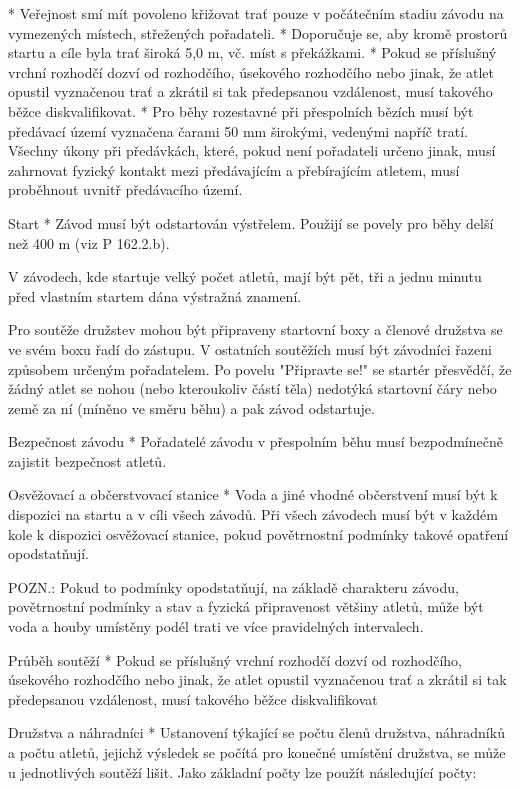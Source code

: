   * Veřejnost smí mít povoleno křižovat trať pouze v počátečním stadiu závodu na vymezených místech, střežených pořadateli.
  * Doporučuje se, aby kromě prostorů startu a cíle byla trať široká 5,0 m, vč. míst s překážkami.
  * Pokud se příslušný vrchní rozhodčí dozví od rozhodčího, úsekového rozhodčího nebo jinak, že atlet opustil vyznačenou trať a zkrátil si tak předepsanou vzdálenost, musí takového běžce diskvalifikovat.
  \enditems
* Pro běhy rozestavné při přespolních bězích musí být předávací území vyznačena čarami 50 mm širokými, vedenými napříč tratí. Všechny úkony při předávkách, které, pokud není pořadateli určeno jinak, musí zahrnovat fyzický kontakt mezi předávajícím a přebírajícím atletem, musí proběhnout uvnitř předávacího území.

Start
* Závod musí být odstartován výstřelem. Použijí se povely pro běhy delší než 400 m (viz P 162.2.b).

V závodech, kde startuje velký počet atletů, mají být pět, tři a jednu minutu před vlastním startem dána výstražná znamení.

Pro soutěže družstev mohou být připraveny startovní boxy a členové družstva se ve svém boxu řadí do zástupu. V ostatních soutěžích musí být závodníci řazeni způsobem určeným pořadatelem. Po povelu "Připravte se!" se startér přesvědčí, že žádný atlet se nohou (nebo kteroukoliv částí těla) nedotýká startovní čáry nebo země za ní (míněno ve směru běhu) a pak závod odstartuje.

Bezpečnost závodu
* Pořadatelé závodu v přespolním běhu musí bezpodmínečně zajistit bezpečnost atletů.

Osvěžovací a občerstvovací stanice
* Voda a jiné vhodné občerstvení musí být k dispozici na startu a v cíli všech závodů. Při všech závodech musí být v každém kole k dispozici osvěžovací stanice, pokud povětrnostní podmínky takové opatření opodstatňují.

POZN.: Pokud to podmínky opodstatňují, na základě charakteru závodu, povětrnostní podmínky a stav a fyzická připravenost většiny atletů, může být voda a houby umístěny podél trati ve více pravidelných intervalech.

Průběh soutěží
* Pokud se příslušný vrchní rozhodčí dozví od rozhodčího, úsekového rozhodčího nebo jinak, že atlet opustil vyznačenou trať a zkrátil si tak předepsanou vzdálenost, musí takového běžce diskvalifikovat

Družstva a náhradníci
* Ustanovení týkající se počtu členů družstva, náhradníků a počtu atletů, jejichž výsledek se počítá pro konečné umístění družstva, se může u jednotlivých soutěží lišit. Jako základní počty lze použít následující počty:

